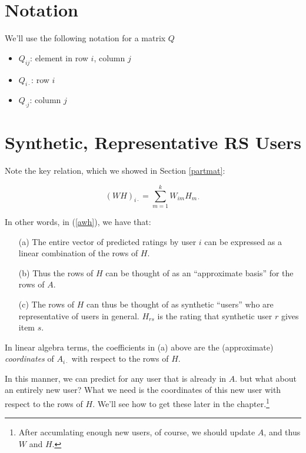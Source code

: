 \section{Notation}

We'll use the following notation for a matrix $Q$

\begin{itemize}

\item $Q_{ij}$:  element in row $i$, column $j$

\item $Q_{i \cdot}$:  row $i$

\item $Q_{\cdot j}$:  column $j$

\end{itemize}

\section{Synthetic, Representative RS Users}

Note the key relation, which we showed in Section \ref{partmat}:

\begin{equation}
(WH)_{i \cdot} = \sum_{m=1}^k W_{im} H_{m \cdot}
\end{equation}

In other words, in (\ref{awh}), we have that:

\begin{itemize}

\item [(a)] The entire vector of predicted ratings by user $i$ can be
expressed as a linear combination of the rows of $H$.

\item [(b)] Thus the rows of $H$ can be thought of as an ``approximate
basis'' for the rows of $A$.

\item [(c)] The rows of $H$ can thus be thought of as synthetic
``users'' who are representative of users in general.  $H_{rs}$ is the
rating that synthetic user $r$ gives item $s$.

\end{itemize} 

In linear algebra terms, the coefficients in (a) above are the
(approximate) \textit{coordinates} of $A_{i \cdot}$ with respect to the
rows of $H$.

In this manner, we can predict for any user that is already in $A$.  but
what about an entirely new user?  What we need is the coordinates of
this new user with respect to the rows of $H$.  We'll see how to get
these later in the chapter.\footnote{After accumlating enough new users,
of course, we should update $A$, and thus $W$ and $H$.}

